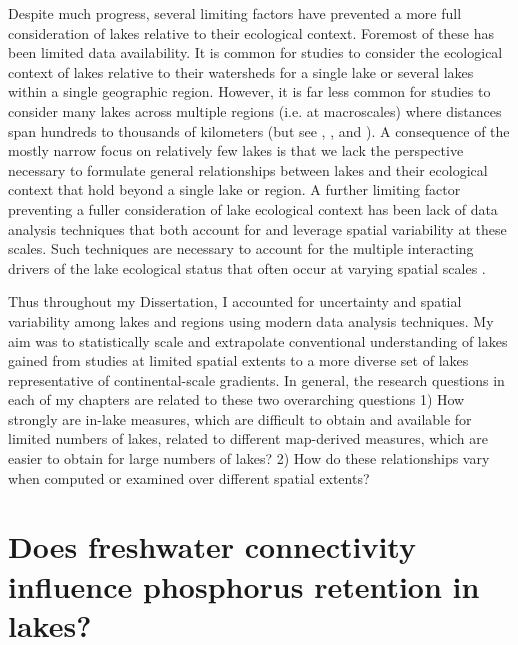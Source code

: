 \documentclass[]{msu-thesis}
\theoremstyle{definition}
\theoremstyle{definition}
\theoremstyle{definition}
\theoremstyle{remark}
\begin{document}
Despite much progress, several limiting factors have prevented a more full consideration of lakes relative to their ecological context. Foremost of these has been limited data availability.  It is common for studies to consider the ecological context of lakes relative to their watersheds for a single lake or several lakes within a single geographic region. However, it is far less common for studies to consider many lakes across multiple regions (i.e. at macroscales) where distances span hundreds to thousands of kilometers (but see \citet{usepa1975}, \citet{landers1988eastern}, and \citet{usepa_nla2012}). A consequence of the mostly narrow focus on relatively few lakes is that we lack the perspective necessary to formulate general relationships between lakes and their ecological context that hold beyond a single lake or region. A further limiting factor preventing a fuller consideration of lake ecological context has been lack of data analysis techniques that both account for and leverage spatial variability at these scales. Such techniques are necessary to account for the multiple interacting drivers of the lake ecological status that often occur at varying spatial scales \citep{allanLandscapesRiverscapesInfluence2004}. \par

Thus throughout my Dissertation, I accounted for uncertainty and spatial variability among lakes and regions using modern data analysis techniques. My aim was to statistically scale and extrapolate conventional understanding of lakes gained from studies at limited spatial extents to a more diverse set of lakes representative of continental-scale gradients. In general, the research questions in each of my chapters are related to these two overarching questions 1) How strongly are in-lake measures, which are difficult to obtain and available for limited numbers of lakes, related to different map-derived measures, which are easier to obtain for large numbers of lakes? 2) How do these relationships vary when computed or examined over different spatial extents?


\chapter{Does freshwater connectivity influence phosphorus retention in lakes?}\label{intro}

\DoubleSpacing
\end{document}
